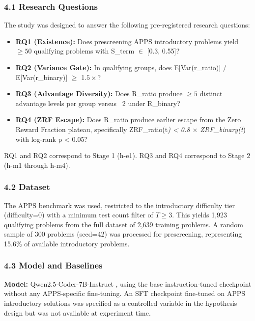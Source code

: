 
\subsubsection{4.1 Research Questions}

The study was designed to answer the following pre-registered research questions:

\begin{itemize}
\item \textbf{RQ1 (Existence):} Does prescreening APPS introductory problems yield $\geq 50$ qualifying problems with S\_term $\in$ [0.3, 0.55]?
\item \textbf{RQ2 (Variance Gate):} In qualifying groups, does E[Var(r\_ratio)] / E[Var(r\_binary)] $\geq$ 1.$5\times$?
\item \textbf{RQ3 (Advantage Diversity):} Does R\_ratio produce $\geq 5$ distinct advantage levels per group versus ~2 under R\_binary?
\item \textbf{RQ4 (ZRF Escape):} Does R\_ratio produce earlier escape from the Zero Reward Fraction plateau, specifically ZRF\_ratio(t\textit{) < 0.8 $\times$ ZRF\_binary(t}) with log-rank p < 0.05?
\end{itemize}

RQ1 and RQ2 correspond to Stage 1 (h-e1). RQ3 and RQ4 correspond to Stage 2 (h-m1 through h-m4).

\subsubsection{4.2 Dataset}

The APPS benchmark \citep{Hendrycks2021} was used, restricted to the introductory difficulty tier (difficulty=0) with a minimum test count filter of $T\geq 3$. This yields 1,923 qualifying problems from the full dataset of 2,639 training problems. A random sample of 300 problems (seed=42) was processed for prescreening, representing 15.6\% of available introductory problems.

\subsubsection{4.3 Model and Baselines}

\textbf{Model:} Qwen2.5-Coder-7B-Instruct \citep{Hui2024}, using the base instruction-tuned checkpoint without any APPS-specific fine-tuning. An SFT checkpoint fine-tuned on APPS introductory solutions was specified as a controlled variable in the hypothesis design but was not available at experiment time.

